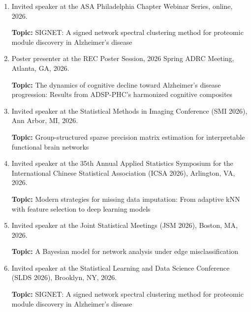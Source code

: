 \documentclass[12pt,letterpaper]{article}
\newenvironment{cventry}{\begin{minipage}[t]{\linewidth}}{\end{minipage}}
\begin{document}
\begin{enumerate}
\begin{cventry}
		\textbf{Topic:} A covariate-assisted community detection 
		algorithm applied to functional brain network data.
		\par\end{cventry}
		\item\begin{cventry} Invited speaker at the ASA Philadelphia Chapter 
		Webinar Series, online, 2026.
		
		\textbf{Topic:} SIGNET: A signed network spectral clustering 
		method for proteomic module discovery in Alzheimer's disease
		\par\end{cventry}
		\item\begin{cventry} Poster presenter at the REC Poster Session, 2026 Spring 
		ADRC Meeting, Atlanta, GA, 2026.
		
		\textbf{Topic:} The dynamics of cognitive decline toward 
		Alzheimer's disease progression: Results from ADSP-PHC's 
		harmonized cognitive composites
		\par\end{cventry}
		\item\begin{cventry} Invited speaker at the Statistical Methods in Imaging 
		Conference (SMI 2026), Ann Arbor, MI, 2026.
		
		\textbf{Topic:} Group-structured sparse precision matrix 
		estimation for interpretable functional brain networks
		\par\end{cventry}
		\item\begin{cventry} Invited speaker at the 35th Annual Applied Statistics 
		Symposium for the International Chinese Statistical 
		Association (ICSA 2026), Arlington, VA, 2026. 
		
		\textbf{Topic:} Modern strategies for missing data 
		imputation: From adaptive kNN with feature selection to deep 
		learning models
		\par\end{cventry}
		\item\begin{cventry} Invited speaker at the Joint Statistical Meetings (JSM 
		2026), Boston, MA, 2026.	
		
		\textbf{Topic:} A Bayesian model for network analysis under 
		edge misclassification
		\par\end{cventry}
		\item\begin{cventry} Invited speaker at the Statistical 
		Learning and Data Science Conference (SLDS 2026), Brooklyn, 
		NY, 2026.	
			
		\textbf{Topic:} SIGNET: A signed network spectral clustering 
		method for proteomic module discovery in Alzheimer's disease
		\par\end{cventry}
	\end{enumerate}
	
\end{document}
